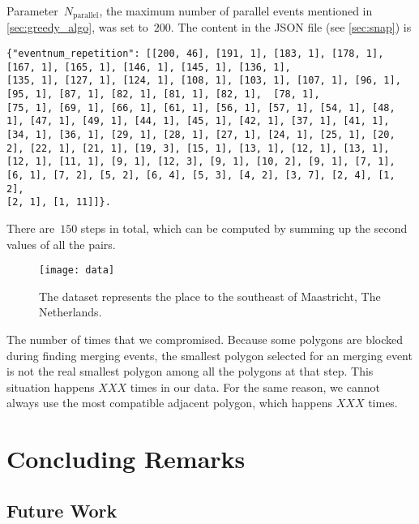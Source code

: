 \documentclass[ijgi,article,submit,moreauthors,pdftex]{Definitions/mdpi}
\begin{document}
Parameter~$N_\mathrm{parallel}$, 
the maximum number of parallel events mentioned in \sect\ref{sec:greedy_algo},
was set to~$200$.
The content in the JSON file (see \sect\ref{sec:snap}) is 
\makeatletter
\def\verbatim@font{\normalfont\rmfamily}
\makeatother
\begin{verbatim}
{"eventnum_repetition": [[200, 46], [191, 1], [183, 1], [178, 1], [167, 1], [165, 1], [146, 1], [145, 1], [136, 1], 
[135, 1], [127, 1], [124, 1], [108, 1], [103, 1], [107, 1], [96, 1], [95, 1], [87, 1], [82, 1], [81, 1], [82, 1],  [78, 1], 
[75, 1], [69, 1], [66, 1], [61, 1], [56, 1], [57, 1], [54, 1], [48, 1], [47, 1], [49, 1], [44, 1], [45, 1], [42, 1], [37, 1], [41, 1], 
[34, 1], [36, 1], [29, 1], [28, 1], [27, 1], [24, 1], [25, 1], [20, 2], [22, 1], [21, 1], [19, 3], [15, 1], [13, 1], [12, 1], [13, 1], 
[12, 1], [11, 1], [9, 1], [12, 3], [9, 1], [10, 2], [9, 1], [7, 1], [6, 1], [7, 2], [5, 2], [6, 4], [5, 3], [4, 2], [3, 7], [2, 4], [1, 2], 
[2, 1], [1, 11]]}.
\end{verbatim}
There are~$150$ steps in total, 
which can be computed by summing up the second values of all the pairs.








\begin{figure}[tb]
\centering
\texttt{[image: data]}
\caption{The dataset represents the place 
    to the southeast of Maastricht, The Netherlands.}
\label{fig:data}
\end{figure}




The number of times that we compromised.
Because some polygons are blocked during finding merging events, 
the smallest polygon selected for an merging event 
is not the real smallest polygon 
among all the polygons at that step. 
This situation happens $XXX$ times in our data.
For the same reason, we cannot always use the most compatible adjacent polygon,
which happens $XXX$ times.












\section{Concluding Remarks}

\subsection{Future Work}
\end{document}
